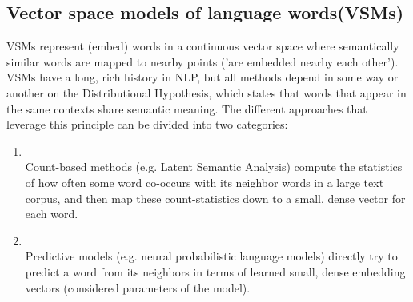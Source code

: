 \subsection{Vector space models of language words(VSMs)}
    VSMs represent (embed) words in a continuous vector space where semantically similar words are mapped to nearby points ('are embedded nearby each other').
    VSMs have a long, rich history in NLP, but all methods depend in some way or another on the Distributional Hypothesis, which states that words that appear in the same contexts share semantic meaning. The different approaches that leverage this principle can be divided into two categories:
  
 \begin{enumerate}
      \item\textcite{Count-based methods} \\
          Count-based methods (e.g. Latent Semantic Analysis) compute the statistics of how often some word co-occurs with its neighbor words in a large text corpus, and then map these count-statistics down to a small, dense vector for each word.
      \item\textcite{predictive methods} \\
            Predictive models (e.g. neural probabilistic language models) directly try to predict a word from its neighbors in terms of learned small, dense embedding vectors (considered parameters of the model).
      
  \end{enumerate}
  
